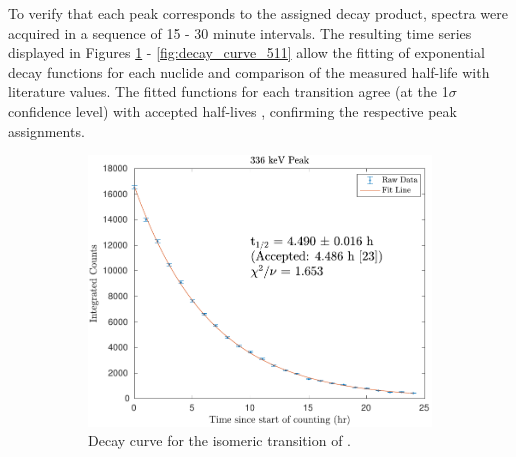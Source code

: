 \documentclass[5p]{elsarticle}
\newcommand{\comment}[1]{\todo[color=blue!20!white,inline]{ASV: #1}}
\begin{document}
To verify that each peak corresponds to the assigned decay product, spectra were acquired in a sequence of 15 - 30 minute intervals. The resulting time series displayed in Figures \ref{fig:decay_curve_336} - \ref{fig:decay_curve_511} allow the fitting of exponential decay functions for each nuclide and comparison of the measured half-life with literature values. The fitted functions for each transition agree (at the 1$\sigma$ confidence level) with accepted half-lives \cite{Burrows2007,Singh2007,Blachot2010a,Blachot2012,Blachot2010}, confirming the respective peak assignments.


\begin{figure}
    \centering
    \begin{subfigure}[t]{0.49\textwidth}
        \centering
        \includegraphics[scale=0.6]{./figures/336keV_curve_new.pdf}
        \caption{ Decay curve for the isomeric transition of .}
        \label{fig:decay_curve_336}
    \end{subfigure}%
     \begin{subfigure}[t]{0.49\textwidth}
        \centering

\end{subfigure}
\end{figure}
\end{document}
